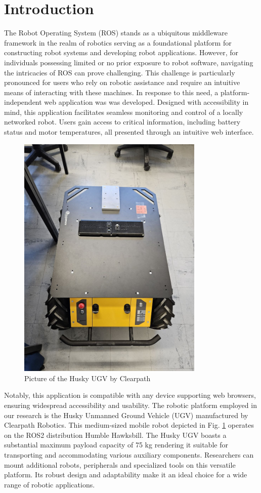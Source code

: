 \documentclass[conference]{IEEEtran}
\begin{document}
\section{Introduction}
The Robot Operating System (ROS) stands as a ubiquitous middleware framework in the realm of robotics serving as a foundational platform for constructing robot systems and developing robot applications. 
However, for individuals possessing limited or no prior exposure to robot software, navigating the intricacies of ROS can prove challenging. 
This challenge is particularly pronounced for users who rely on robotic assistance and require an intuitive means of interacting with these machines.
In response to this need, a platform-independent web application was was developed. 
Designed with accessibility in mind, this application facilitates seamless monitoring and control of a locally networked robot. Users gain access to critical information, including battery status and motor temperatures, all presented through an intuitive web interface. 
\begin{figure}[htp]
    \centerline{\includegraphics[width=8.9cm]{Pictures/husky_costum.jpeg}}
    \caption{Picture of the Husky UGV by Clearpath}
    \label{fig:huskyClearpath}
\end{figure}
Notably, this application is compatible with any device supporting web browsers, ensuring widespread accessibility and usability.
The robotic platform employed in our research is the Husky Unmanned Ground Vehicle (UGV) manufactured by Clearpath Robotics. This medium-sized mobile robot depicted in Fig. \ref{fig:huskyClearpath} operates on the ROS2 distribution Humble Hawksbill.
The Husky UGV boasts a substantial maximum payload capacity of 75 kg rendering it suitable for transporting and accommodating various auxiliary components. Researchers can mount additional robots, peripherals and specialized tools on this versatile platform. Its robust design and adaptability make it an ideal choice for a wide range of robotic applications\cite{huskyClearpath}. 
\end{document}
